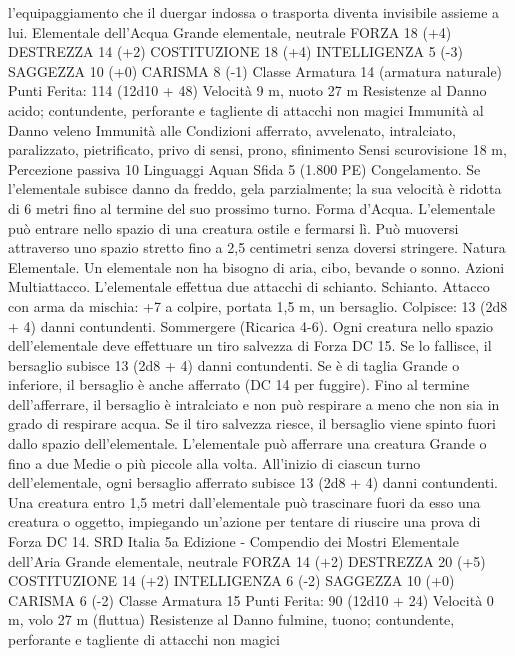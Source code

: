 \begin{multicols}{2}
l’equipaggiamento che il duergar indossa o trasporta diventa
invisibile assieme a lui.
Elementale dell’Acqua
Grande elementale, neutrale
FORZA 18 (+4)
DESTREZZA 14 (+2)
COSTITUZIONE 18 (+4)
INTELLIGENZA 5 (-3)
SAGGEZZA 10 (+0)
CARISMA 8 (-1)
Classe Armatura 14 (armatura naturale)
\hspace*{0pt}\hfill{Punti Ferita}: 114 (12d10 + 48)
Velocità 9 m, nuoto 27 m
Resistenze al Danno acido; contundente, perforante e tagliente
di attacchi non magici
Immunità al Danno veleno
Immunità alle Condizioni afferrato, avvelenato, intralciato,
paralizzato, pietrificato, privo di sensi, prono, sfinimento
Sensi scurovisione 18 m, Percezione passiva 10
Linguaggi Aquan
Sfida 5 (1.800 PE)
Congelamento. Se l’elementale subisce danno da freddo, gela
parzialmente; la sua velocità è ridotta di 6 metri fino al termine
del suo prossimo turno.
Forma d’Acqua. L’elementale può entrare nello spazio di una
creatura ostile e fermarsi lì. Può muoversi attraverso uno spazio
stretto fino a 2,5 centimetri senza doversi stringere.
Natura Elementale. Un elementale non ha bisogno di aria, cibo,
bevande o sonno.
Azioni
Multiattacco. L’elementale effettua due attacchi di schianto.
Schianto. Attacco con arma da mischia: +7 a colpire, portata 1,5
m, un bersaglio.
Colpisce: 13 (2d8 + 4) danni contundenti.
Sommergere (Ricarica 4-6). Ogni creatura nello spazio
dell’elementale deve effettuare un tiro salvezza di Forza DC 15.
Se lo fallisce, il bersaglio subisce 13 (2d8 + 4) danni
contundenti. Se è di taglia Grande o inferiore, il bersaglio è
anche afferrato (DC 14 per fuggire). Fino al termine
dell’afferrare, il bersaglio è intralciato e non può respirare a
meno che non sia in grado di respirare acqua. Se il tiro salvezza
riesce, il bersaglio viene spinto fuori dallo spazio
dell’elementale.
L’elementale può afferrare una creatura Grande o fino a due
Medie o più piccole alla volta. All’inizio di ciascun turno
dell’elementale, ogni bersaglio afferrato subisce 13 (2d8 + 4)
danni contundenti. Una creatura entro 1,5 metri dall’elementale
può trascinare fuori da esso una creatura o oggetto, impiegando
un’azione per tentare di riuscire una prova di Forza DC 14.
SRD Italia 5a Edizione - Compendio dei Mostri
Elementale dell’Aria
Grande elementale, neutrale
FORZA 14 (+2)
DESTREZZA 20 (+5)
COSTITUZIONE 14 (+2)
INTELLIGENZA 6 (-2)
SAGGEZZA 10 (+0)
CARISMA 6 (-2)
Classe Armatura 15
\hspace*{0pt}\hfill{Punti Ferita}: 90 (12d10 + 24)
Velocità 0 m, volo 27 m (fluttua)
Resistenze al Danno fulmine, tuono; contundente, perforante e
tagliente di attacchi non magici

\end{multicols}
